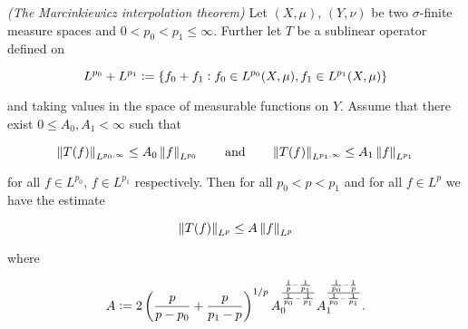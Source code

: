 \begin{mdframed}
	\begin{theorem}\emph{(The Marcinkiewicz interpolation theorem)}
		Let $(X,\mu)$, $(Y,\nu)$ be two $\sigma$-finite measure spaces and $0 < p_0 < p_1 \leq \infty$. Further let $T$ be a sublinear operator defined on
		
		\begin{equation*}
			L^{p_0} + L^{p_1} := \cbr[0]{ f_0 + f_1 : f_0 \in L^{p_0}(X,\mu), f_1 \in L^{p_1}(X,\mu)}
		\end{equation*}
		
		\noindent and taking values in the space of measurable functions on $Y$. Assume that there exist $0 \leq A_0,A_1 < \infty$ such that

		\begin{equation}
			\norm[0]{T(f)}_{L^{p_0,\infty}} \leq A_0 \norm[0]{f}_{L^{p_0}} \qquad \text{and} \qquad \norm[0]{T(f)}_{L^{p_1,\infty}} \leq A_1 \norm[0]{f}_{L^{p_1}}\label{hyp:fp_0fp_1}
		\end{equation}

		\noindent for all $f \in L^{p_0}$, $f \in L^{p_1}$ respectively. Then for all $p_0 < p < p_1$ and for all $f \in L^p$ we have the estimate

		\begin{equation}
			\norm[0]{T(f)}_{L^p} \leq A \norm[0]{f}_{L^p}
		\end{equation}

		\noindent where

		\begin{equation}
			A := 2\del[3]{ \frac{p}{p - p_0} + \frac{p}{p_1 - p} }^{1/p}A_0^{\frac{\frac{1}{p} - \frac{1}{p_1}}{\frac{1}{p_0}-\frac{1}{p_1}}}A_1^{\frac{\frac{1}{p_0}-\frac{1}{p}}{\frac{1}{p_0}-\frac{1}{p_1}}}.
			\label{eq:constant}
		\end{equation}
	\end{theorem}
\end{mdframed}

